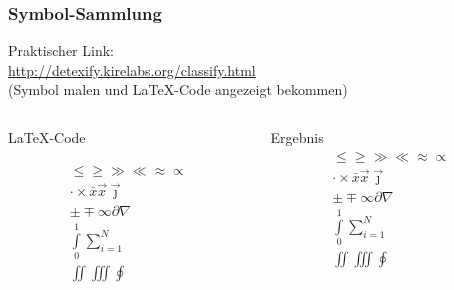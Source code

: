 \begin{frame}[fragile]
    \frametitle{Symbol-Sammlung}
    Praktischer Link: \\
    \href{http://detexify.kirelabs.org/classify.html}{http://detexify.kirelabs.org/classify.html} \\
    (Symbol malen und LaTeX-Code angezeigt bekommen)
    \begin{columns}[T]
        \begin{column}{0.7\textwidth}
            \begin{block}{\LaTeX-Code}
                \begin{lstverbatim}
                \begin{align}
                    \leq \geq \gg \ll \approx \propto \\
                    \cdot \times \bar{x} \vec{x} \vec{\jmath} \\
                    \pm \mp \infty \partial \nabla \\
                    \int\limits_0^1 \sum\limits_{i=1}^N \\
                    \iint \iiint \oint
                \end{align}
                \end{lstverbatim}
            \end{block}
        \end{column}
        \begin{column}{0.25\textwidth}
            \begin{block}{Ergebnis}
                \begin{align*}
                    \leq \geq \gg \ll \approx \propto \\
                    \cdot \times \bar{x} \vec{x} \vec{\jmath} \\
                    \pm \mp \infty \partial \nabla \\
                    \int\limits_0^1 \sum\limits_{i=1}^N \\
                    \iint \iiint \oint
                \end{align*}
            \end{block}
        \end{column}
    \end{columns}
\end{frame}
